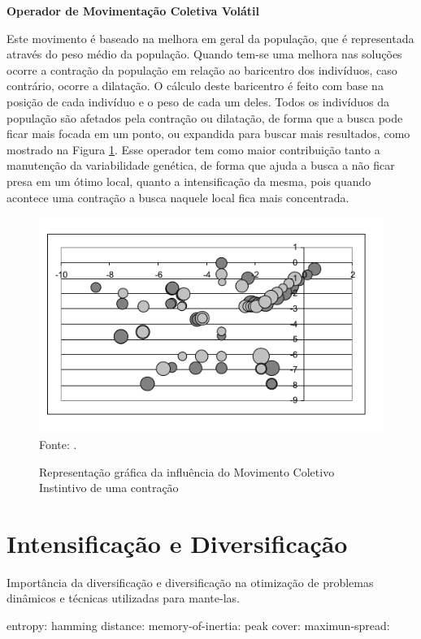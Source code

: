\noindent \textbf{Operador de Movimentação Coletiva Volátil}

Este movimento é baseado na melhora em geral da população, que é representada através do peso médio da população. Quando tem-se uma melhora nas soluções ocorre a contração da população em relação ao baricentro dos indivíduos, caso contrário, ocorre a dilatação. O cálculo deste baricentro é feito com base na posição de cada indivíduo e o peso de cada um deles. Todos os indivíduos da população são afetados pela contração ou dilatação, de forma que a busca pode ficar mais focada em um ponto, ou expandida para buscar mais resultados, como mostrado na Figura \ref{fig:volitute_moviment}. Esse operador tem como maior contribuição tanto a manutenção da variabilidade genética, de forma que ajuda a busca a não ficar presa em um ótimo local, quanto a intensificação da mesma, pois quando acontece uma contração a busca naquele local fica mais concentrada.

\begin{figure}[!htb]
	\caption{Representação gráfica da influência do Movimento Coletivo Instintivo de uma contração}
	\centering
	\includegraphics[scale=0.5]{images/movimento_volatil.png}
	\label{fig:volitute_moviment}{\\Fonte: .}
\end{figure}

\section{Intensificação e Diversificação}
\label{sec:intesification_diversification}
Importância da diversificação e diversificação na otimização de problemas dinâmicos e técnicas utilizadas para mante-las.

entropy: \cite{mori2001adaptation}
hamming distance: \cite{rand2005measurements}
memory-of-inertia: \cite{morrison2001measurement}
peak cover: \cite{branke2012evolutionary}
maximun-spread: \cite{goh2009competitive}